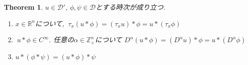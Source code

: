\documentclass[dvipdfmx,a4paper,11pt]{article} %
\newtheorem{thm}{Theorem}[section]
\theoremstyle{definition}
\theoremstyle{remark}
\numberwithin{equation}{section}
\newcommand{\R}{\mathbb{R}}
\newcommand{\N}{\mathbb{Z}_+}
\begin{document}
\begin{tcolorbox}[mybox]
\begin{thm}\cite[Theorem 6.30]{Rud}
\label{thm-H-2.10}
 \(u \in \mathcal{D}'\), \(\phi, \psi \in \mathcal{D}\)とする時次が成り立つ. 
\begin{enumerate}[label=$(\alph*)$]
\item $x \in \R^n$について,  \(\ \tau_x(u \ast \phi) = (\tau_x u) \ast \phi = u \ast (\tau_x \phi)\)
\item  \(\ u \ast \phi \in C^\infty\). 任意の$\alpha \in \N^n$について 
\(D^\alpha (u \ast \phi) = (D^\alpha u) \ast \phi = u \ast (D^\alpha \phi) \) 
\item \( u \ast (\phi \ast \psi) = (u \ast \phi) \ast \psi \) 
\end{enumerate}
\end{thm}
\end{tcolorbox}
\end{document}

